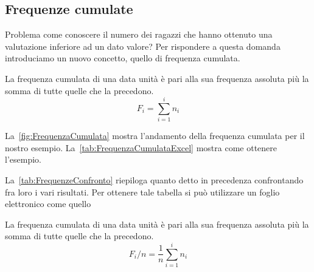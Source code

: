 \subsection{Frequenze cumulate}
Problema come conoscere il numero dei ragazzi che hanno ottenuto una valutazione inferiore ad un dato valore? Per rispondere a questa domanda introduciamo un nuovo concetto, quello di frequenza cumulata.
\begin{defn}
	La frequenza cumulata di una data unità è pari alla sua frequenza assoluta più la somma di tutte quelle che la  precedono.\[F_{i}=\sum_{i=1}^{i}n_{i}\]
\end{defn}
La~\vref*{fig:FrequenzaCumulata} mostra l'andamento della frequenza cumulata per il nostro esempio. La~\vref{tab:FrequenzaCumulataExcel} mostra come ottenere l'esempio.

La~\vref{tab:FrequenzeConfronto} riepiloga quanto detto in precedenza confrontando fra loro i vari risultati. Per ottenere tale tabella si può utilizzare un foglio elettronico come quello~
\begin{defn}
	La frequenza cumulata di una data unità è pari alla sua frequenza assoluta più la somma di tutte quelle che la  precedono.\[F_{i}/n=\dfrac{1}{n}\sum_{i=1}^{i}n_{i}\]
\end{defn}
 
 